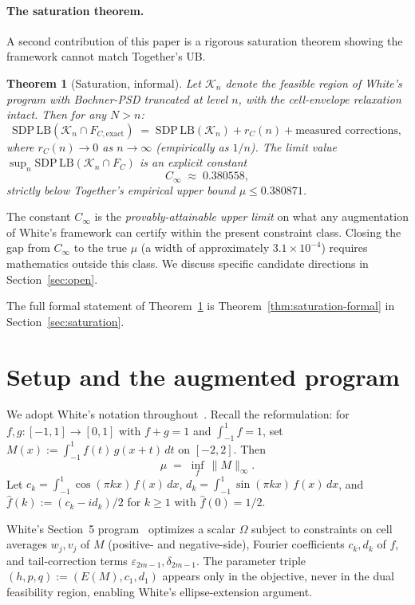 \documentclass[11pt]{article}
\theoremstyle{plain}
\newtheorem{theorem}{Theorem}
\theoremstyle{definition}
\begin{document}
\paragraph{The saturation theorem.}
A second contribution of this paper is a rigorous saturation theorem
showing the framework cannot match Together's UB.

\begin{theorem}[Saturation, informal]\label{thm:saturation-informal}
Let $\mathcal{K}_n$ denote the feasible region of White's program with
Bochner-PSD truncated at level $n$, with the cell-envelope relaxation
intact. Then for any $N > n$:
\[
\mathrm{SDP\,LB}(\mathcal{K}_n \cap F_{C,\text{exact}})
\;=\;
\mathrm{SDP\,LB}(\mathcal{K}_n) + r_C(n) + \text{measured corrections},
\]
where $r_C(n) \to 0$ as $n \to \infty$ (empirically as $1/n$). The
limit value $\sup_n \mathrm{SDP\,LB}(\mathcal{K}_n \cap F_C)$ is an
explicit constant
\[
C_\infty \;\approx\; 0.380558,
\]
strictly below Together's empirical upper bound $\mu \le 0.380871$.
\end{theorem}

The constant $C_\infty$ is the \emph{provably-attainable upper limit}
on what any augmentation of White's framework can certify within the
present constraint class. Closing the gap from $C_\infty$ to the true
$\mu$ (a width of approximately $3.1 \times 10^{-4}$) requires
mathematics outside this class. We discuss specific candidate
directions in Section~\ref{sec:open}.

The full formal statement of Theorem~\ref{thm:saturation-informal} is
Theorem~\ref{thm:saturation-formal} in Section~\ref{sec:saturation}.

\section{Setup and the augmented program}\label{sec:setup}

We adopt White's notation throughout~\cite[\S2]{White2023}. Recall the
reformulation: for $f, g : [-1, 1] \to [0, 1]$ with $f + g = 1$ and
$\int_{-1}^1 f = 1$, set
\(
M(x) := \int_{-1}^1 f(t)\, g(x + t)\, dt
\)
on $[-2, 2]$. Then
\[
\mu \;=\; \inf_f\, \|M\|_\infty.
\]
Let $c_k = \int_{-1}^1 \cos(\pi k x)\, f(x)\, dx$,
$d_k = \int_{-1}^1 \sin(\pi k x)\, f(x)\, dx$, and
$\hat f(k) := (c_k - i d_k)/2$ for $k \ge 1$ with $\hat f(0) = 1/2$.

White's Section~5 program~\cite[\S5]{White2023} optimizes a scalar
$\Omega$ subject to constraints on cell averages $w_j, v_j$ of $M$
(positive- and negative-side), Fourier coefficients $c_k, d_k$ of $f$,
and tail-correction terms $\varepsilon_{2m-1}, \delta_{2m-1}$. The
parameter triple $(h, p, q) := (E(M), c_1, d_1)$ appears only in the
objective, never in the dual feasibility region, enabling White's
ellipse-extension argument.
\end{document}
